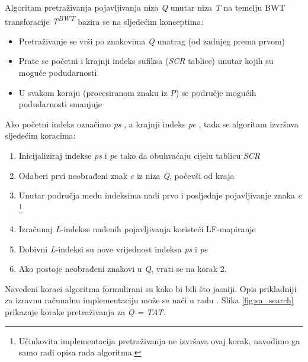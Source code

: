 \documentclass[times, utf8, seminar, numeric]{fer}
\begin{document}
Algoritam pretraživanja pojavljivanja niza \textit{Q} unutar niza \textit{T} na temelju
BWT transforacije \textit{T\textsuperscript{BWT}} bazira se na sljedećim konceptima:

\begin{itemize}
  \item{Pretraživanje se vrši po znakovima \textit{Q} unatrag (od zadnjeg prema prvom)}
  \item{Prate se početni i krajnji indeks sufiksa (\textit{SCR} tablice) unutar kojih su moguće podudarnosti}
  \item{U svakom koraju (procesiranom znaku iz \textit{P}) se područje mogućih podudarnosti smanjuje}
\end{itemize}

Ako početni indeks označimo \textit{ps} , a krajnji indeks \textit{pe}
, tada se algoritam izvršava sljedećim koracima:

\begin{enumerate}
  \item{Inicijaliziraj indekse \textit{ps} i \textit{pe} tako da obuhvaćaju cijelu tablicu \textit{SCR}}
  \item{Odaberi prvi neobrađeni znak \textit{c} iz niza \textit{Q}, počevši od kraja}
  \item{Unutar područja među indeksima nađi prvo i posljednje pojavljivanje znaka \textit{c}
    \footnote{Učinkovita implementacija pretraživanja ne izvršava ovaj korak, navodimo ga
    samo radi opisa rada algoritma.}}
  \item{Izračunaj \textit{L}-indekse nađenih pojavljivanja koristeći LF-mapiranje}
  \item{Dobivni \textit{L}-indeksi su nove vrijednost indeksa \textit{ps} i \textit{pe}}
  \item{Ako postoje neobrađeni znakovi u \textit{Q}, vrati se na korak 2.}
\end{enumerate}

Navedeni koraci algoritma formulirani su kako bi bili što jasniji. Opis prikladniji
za izravnu računalnu implementaciju može se naći u radu \cite{singer_2012}. Slika
\ref{fig:sa_search} prikazuje korake pretraživanja za \textit{Q = TAT}.
\end{document}
